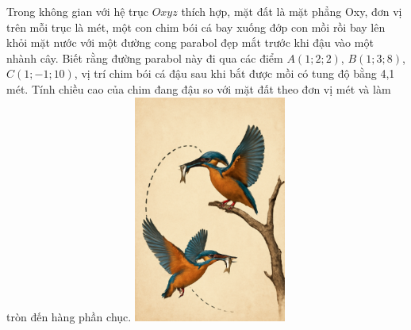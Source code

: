 \begin{ex}%
\immini
{
    Trong không gian với hệ trục $Oxyz$ thích hợp, mặt đất là mặt phẳng Oxy, đơn vị trên mỗi trục là mét, một con chim bói cá bay xuống đớp con mồi rồi bay lên khỏi mặt nước với một đường cong parabol đẹp mắt trước khi đậu vào một nhành cây. Biết rằng đường parabol này đi qua các điểm $ A\left(1;2;2\right)$, $B\left(1;3;8\right)$, $C\left(1;-1;10\right)$, vị trí chim bói cá đậu sau khi bắt được mồi có tung độ bằng 4,1 mét. Tính chiều cao của chim đang đậu so với mặt đất theo đơn vị mét và làm tròn đến hàng phần chục.
}
{
    \includegraphics[width=5cm]{img/HXN-12-20}
}
\end{ex}
